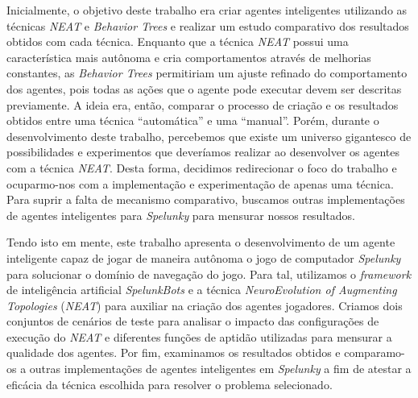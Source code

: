Inicialmente, o objetivo deste trabalho era criar agentes inteligentes
utilizando as técnicas \textit{NEAT} e \textit{Behavior Trees} e realizar um
estudo comparativo dos resultados obtidos com cada técnica. Enquanto que a
técnica \textit{NEAT} possui uma característica mais autônoma e cria
comportamentos através de melhorias constantes, as \textit{Behavior Trees}
permitiriam um ajuste refinado do comportamento dos agentes, pois todas as ações
que o agente pode executar devem ser descritas previamente. A ideia era, então,
comparar o processo de criação e os resultados obtidos entre uma técnica
``automática'' e uma ``manual''. Porém, durante o desenvolvimento deste
trabalho, percebemos que existe um universo gigantesco de possibilidades e
experimentos que deveríamos realizar ao desenvolver os agentes com a técnica
\textit{NEAT}. Desta forma, decidimos redirecionar o foco do trabalho e
ocuparmo-nos com a implementação e experimentação de apenas uma técnica. Para
suprir a falta de mecanismo comparativo, buscamos outras implementações de
agentes inteligentes para \textit{Spelunky} para mensurar nossos resultados.

Tendo isto em mente, este trabalho apresenta o desenvolvimento de um agente
inteligente capaz de jogar de maneira autônoma o jogo de computador
\textit{Spelunky} para solucionar o domínio de navegação do jogo. Para tal,
utilizamos o \textit{framework} de inteligência artificial \textit{SpelunkBots}
e a técnica \textit{NeuroEvolution of Augmenting Topologies} (\textit{NEAT})
para auxiliar na criação dos agentes jogadores. Criamos dois conjuntos de
cenários de teste para analisar o impacto das configurações de execução do
\textit{NEAT} e diferentes funções de aptidão utilizadas para mensurar a
qualidade dos agentes. Por fim, examinamos os resultados obtidos e comparamo-os
a outras implementações de agentes inteligentes em \textit{Spelunky} a fim de
atestar a eficácia da técnica escolhida para resolver o problema selecionado.


